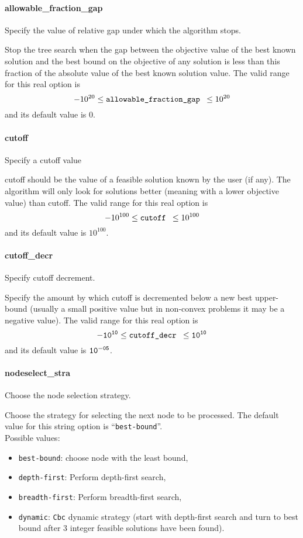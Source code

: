 \paragraph{allowable\_fraction\_gap}
Specify the value of relative gap under which the algorithm stops.

 Stop the tree search when the gap between the
objective value of the best known solution and
the best bound on the objective of any solution
is less than this fraction of the absolute value
of the best known solution value. The valid range for this real option is
$$-10^{20} \le \hbox{\tt allowable\_fraction\_gap } \le 10^{20}$$
and its default value is $0$.

\paragraph{cutoff}Specify a cutoff value

cutoff should be the value of a feasible solution known by the user
(if any). The algorithm will only look for solutions better (meaning with a lower objective value)
than cutoff. The valid range for this real option is
$$-10^{100} \le \hbox{\tt cutoff } \le 10^{100}$$
and its default value is $10^{100}$.


\paragraph{cutoff\_decr} Specify cutoff decrement.

 Specify the amount by which cutoff is decremented
below a new best upper-bound (usually a small
positive value but in non-convex problems it may
be a negative value). The valid range for this real option is
$${\tt -10^{10}} \le \hbox{\tt cutoff\_decr } \le {\tt 10^{10}}$$
and its default value is ${\tt 10^{-05}}$.


\paragraph{nodeselect\_stra} Choose the node selection strategy.

 Choose the strategy for selecting the next node
to be processed.
The default value for this string option is ``{\tt best-bound}''.
\\
Possible values:
\begin{itemize}
   \item {\tt best-bound}: choose node with the least bound,
   \item {\tt depth-first}: Perform depth-first search,
   \item {\tt breadth-first}: Perform breadth-first search,
   \item {\tt dynamic}: {\tt Cbc} dynamic strategy (start with depth-first
search and turn to best bound after 3 integer
feasible solutions have been found).
\end{itemize}


